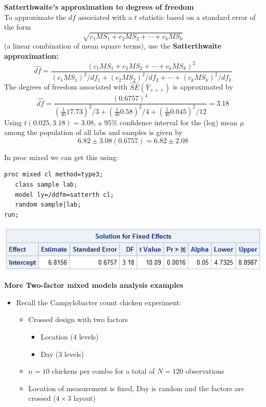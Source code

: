 \textbf{Satterthwaite's approximation to degrees of freedom}\\
To approximate the $df$ associated with a $t$ statistic based on a standard error of the form
$$ \sqrt{c_1 MS_1 + c_2 MS_2 + \cdots + c_k MS_k}$$
(a linear combination of mean square terms), use the \textbf{Satterthwaite approximation:}
$$ \widehat{df} = \frac{(c_1 MS_1 + c_2 MS_2 + \cdots + c_k MS_k)^2}{(c_1 MS_1)^2/df_1 + (c_2 MS_2)^2/df_2 + \cdots + (c_k MS_k)^2/df_k}$$
The degrees of freedom associated with $\widehat{SE}(\bar{Y}_{+++})$ is approximated by
$$\widehat{df} = \frac{(0.6757)^4}{(\frac{1}{40}17.73)^2/3 + (\frac{1}{40}0.58)^2/4 +  (\frac{1}{40}0.045)^2/12} = 3.18$$
Using $t(0.025,3.18) = 3.08$, a $95\%$ confidence interval for the (log) mean $\mu$ among the population of all labs and samples is given by
$$ 6.82 \pm 3.08 (0.6757)= 6.82 \pm 2.08$$

In proc mixed we can get this using:
\begin{small}
\begin{verbatim}
proc mixed cl method=type3; 
   class sample lab;
   model ly=/ddfm=satterth cl;
   random sample|lab;
run;
\end{verbatim}
\end{small}

\begin{center}
\includegraphics[scale=0.7]{MilkMixed2}
\end{center}

\newpage

\textbf{More Two-factor mixed models analysis examples}
\begin{itemize}
\item Recall the Campylobacter count chicken experiment:
\begin{itemize}
\item Crossed design with two factors
\begin{itemize}
\item Location (4 levels)
\item Day (3 levels)
\end{itemize}
\item $n=10$ chickens per combo for a total of $N=120$ observations
\item Location of measurement is fixed, Day is random and the factors are crossed ($4 \times 3$ layout)
\end{itemize}
\end{itemize}

